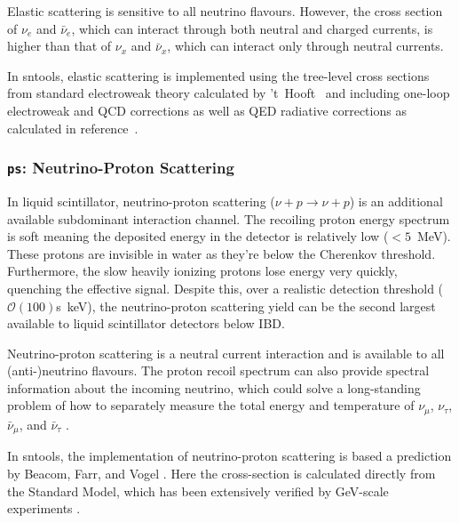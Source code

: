 \documentclass[11pt, oneside]{article}
\newcommand{\nue}{\ensuremath{\nu_e}\xspace}
\newcommand{\nux}{\ensuremath{\nu_x}\xspace}
\newcommand{\nuebar}{\ensuremath{\bar{\nu}_e}\xspace}
\newcommand{\nuxbar}{\ensuremath{\bar{\nu}_x}\xspace}
\begin{document}
Elastic scattering is sensitive to all neutrino flavours.
However, the cross section of \nue and \nuebar, which can interact through both neutral and charged currents, is higher than that of \nux and \nuxbar, which can interact only through neutral currents.

In sntools, elastic scattering is implemented using the tree-level cross sections from standard electroweak theory calculated by ’t~Hooft~\cite{t-Hooft1971} and including one-loop electroweak and QCD corrections as well as QED radiative corrections as calculated in reference~\cite{Bahcall1995}.

\subsubsection{\texttt{ps}: Neutrino-Proton Scattering}
In liquid scintillator, neutrino-proton scattering ($\nu + p \rightarrow \nu + p$) is an additional available subdominant interaction channel. The recoiling proton energy spectrum is soft meaning the deposited energy in the detector is relatively low ($<5$~MeV). These protons are invisible in water as they're below the Cherenkov threshold. Furthermore, the slow heavily ionizing protons lose energy very quickly, quenching the effective signal. Despite this, over a realistic detection threshold ($\mathcal{O}(100)$s~keV), the neutrino-proton scattering yield can be the second largest available to liquid scintillator detectors below IBD. 

Neutrino-proton scattering is a neutral current interaction and is available to all (anti-)neutrino flavours. The proton recoil spectrum can also provide spectral information about the incoming neutrino, which could solve a long-standing problem of how to separately measure the total energy and temperature of $\nu_{\mu}$, $\nu_{\tau}$, $\bar{\nu}_{\mu}$, and $\bar{\nu}_{\tau}$ \cite{beacom2002detection}.

In sntools, the implementation of neutrino-proton scattering is based a prediction by Beacom, Farr, and Vogel \cite{beacom2002detection}. Here the cross-section is calculated directly from the Standard Model, which has been extensively verified by GeV-scale experiments \cite{ahrens1987measurement}. 
\end{document}
